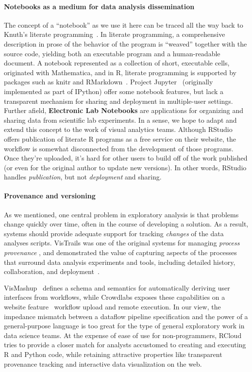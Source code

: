 \paragraph*{Notebooks as a medium for data analysis dissemination}
The concept of a ``notebook'' as we use it here can be traced all the
way back to Knuth's literate programming~\cite{Knuth:1984:LP}. In
literate programming, a comprehensive description in prose of the
behavior of the program is ``weaved'' together with the source code,
yielding both an executable program and a human-readable document.  A
notebook represented as a collection of short, executable cells,
originated with Mathematica, and in R, literate programming is
supported by packages such as knitr and RMarkdown~\cite{Xie:2013:DDW}.
Project Jupyter~\cite{jupyter} (originally implemented as part of
IPython) offer some notebook features, but lack a transparent
mechanism for sharing and deployment in multiple-user settings.
%
Further afield, {\bf Electronic Lab Notebooks} are applications for organizing
and sharing data from scientific lab experiments\cite{Rubacha:2011:ELN}.
In a sense, we hope to adapt and extend this concept to the work of
visual analytics teams.
%
Although RStudio offers publication of literate R programs as a free
service on their website, the workflow is somewhat disconnected from
the development of those programs. Once they're uploaded, it's hard
for other users to build off of the work published (or even for the
original author to update new versions). In other words, RStudio
handles \emph{publication}, but not \emph{deployment} and sharing.

\paragraph*{Provenance and versioning} As
we mentioned, one central problem in exploratory analysis is that
problems change quickly over time, often in the course of developing a
solution. As a result, systems should provide adequate support for
tracking \emph{changes} of the data analyses scripts.  VisTrails was
one of the original systems for managing \emph{process provenance} ,
and demonstrated the value of capturing aspects of the processes that
surround data analysis experiments and tools, including detailed
history, collaboration, and deployment~\cite{Callahan:2006:VVM}.

VisMashup~\cite{Santos:2009:VST}  defines a schema and
semantics for automatically deriving user interfaces from workflows,
while Crowdlabs exposes these capabilities on a website
feature~\cite{Mates:2011:CSA} workflow upload and remote execution. In
our view, the impedance mismatch between a dataflow pipeline
specification and the power of a general-purpose language is too great
for the type of general exploratory work in data science teams. At the
expense of ease of use for non-programmers, RCloud tries to provide a
closer match for analysts accustomed to creating and executing R and
Python code, while retaining attractive properties like transparent
provenance tracking and interactive data visualization on the web.

